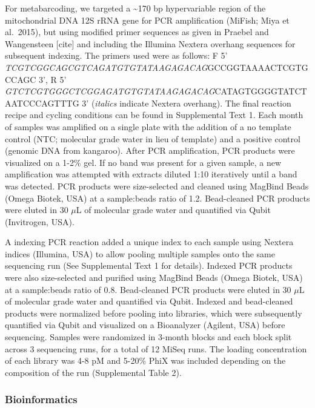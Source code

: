 \documentclass[
]{article}
\begin{document}
For metabarcoding, we targeted a \textasciitilde170 bp hypervariable
region of the mitochondrial DNA 12S rRNA gene for PCR amplification
(MiFish; Miya et al.~2015), but using modified primer sequences as given
in Praebel and Wangensteen {[}cite{]} and including the Illumina Nextera
overhang sequences for subsequent indexing. The primers used were as
follows: F 5'
\emph{TCGTCGGCAGCGTCAGATGTGTATAAGAGACAG}GCCGGTAAAACTCGTGCCAGC 3', R 5'
\emph{GTCTCGTGGGCTCGGAGATGTGTATAAGAGACAG}CATAGTGGGGTATCTAATCCCAGTTTG 3'
(\emph{italics} indicate Nextera overhang). The final reaction recipe
and cycling conditions can be found in Supplemental Text 1. Each month
of samples was amplified on a single plate with the addition of a no
template control (NTC; molecular grade water in lieu of template) and a
positive control (genomic DNA from kangaroo). After PCR amplification,
PCR products were visualized on a 1-2\% gel. If no band was present for
a given sample, a new amplification was attempted with extracts diluted
1:10 iteratively until a band was detected. PCR products were
size-selected and cleaned using MagBind Beads (Omega Biotek, USA) at a
sample:beads ratio of 1.2. Bead-cleaned PCR products were eluted in 30
\(\mu\)L of molecular grade water and quantified via Qubit (Invitrogen,
USA).

A indexing PCR reaction added a unique index to each sample using
Nextera indices (Illumina, USA) to allow pooling multiple samples onto
the same sequencing run (See Supplemental Text 1 for details). Indexed
PCR products were also size-selected and purified using MagBind Beads
(Omega Biotek, USA) at a sample:beads ratio of 0.8. Bead-cleaned PCR
products were eluted in 30 \(\mu\)L of molecular grade water and
quantified via Qubit. Indexed and bead-cleaned products were normalized
before pooling into libraries, which were subsequently quantified via
Qubit and visualized on a Bioanalyzer (Agilent, USA) before sequencing.
Samples were randomized in 3-month blocks and each block split across 3
sequencing runs, for a total of 12 MiSeq runs. The loading concentration
of each library was 4-8 pM and 5-20\% PhiX was included depending on the
composition of the run (Supplemental Table 2).

\hypertarget{bioinformatics}{%
\subsubsection{Bioinformatics}\label{bioinformatics}}
\end{document}
